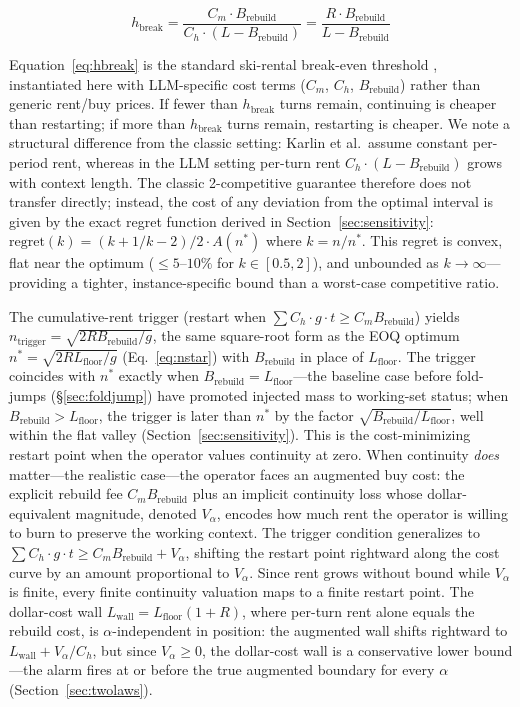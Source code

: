 \documentclass[11pt]{article}
\theoremstyle{definition}
\theoremstyle{remark}
\begin{document}
\begin{equation}
h_{\text{break}} = \frac{C_m \cdot B_{\text{rebuild}}}{C_h \cdot (L - B_{\text{rebuild}})} = \frac{R \cdot B_{\text{rebuild}}}{L - B_{\text{rebuild}}}
\label{eq:hbreak}
\end{equation}

Equation~\ref{eq:hbreak} is the standard ski-rental break-even threshold \citep{karlin1994}, instantiated here with LLM-specific cost terms ($C_m$, $C_h$, $B_{\text{rebuild}}$) rather than generic rent/buy prices. If fewer than $h_{\text{break}}$ turns remain, continuing is cheaper than restarting; if more than $h_{\text{break}}$ turns remain, restarting is cheaper. We note a structural difference from the classic setting: Karlin et al.\ assume constant per-period rent, whereas in the LLM setting per-turn rent $C_h \cdot (L - B_{\text{rebuild}})$ grows with context length. The classic 2-competitive guarantee \citep{karlin1994} therefore does not transfer directly; instead, the cost of any deviation from the optimal interval is given by the exact regret function derived in Section~\ref{sec:sensitivity}: $\text{regret}(k) = (k + 1/k - 2)/2 \cdot A(n^*)$ where $k = n/n^*$. This regret is convex, flat near the optimum ($\le 5$--$10\%$ for $k \in [0.5, 2]$), and unbounded as $k \to \infty$---providing a tighter, instance-specific bound than a worst-case competitive ratio.

The cumulative-rent trigger (restart when $\sum C_h \cdot g \cdot t \ge C_m B_{\text{rebuild}}$) yields $n_{\text{trigger}} = \sqrt{2 R B_{\text{rebuild}} / g}$, the same square-root form as the EOQ optimum $n^* = \sqrt{2 R L_{\text{floor}} / g}$ (Eq.~\ref{eq:nstar}) with $B_{\text{rebuild}}$ in place of $L_{\text{floor}}$. The trigger coincides with $n^*$ exactly when $B_{\text{rebuild}} = L_{\text{floor}}$---the baseline case before fold-jumps (\S\ref{sec:foldjump}) have promoted injected mass to working-set status; when $B_{\text{rebuild}} > L_{\text{floor}}$, the trigger is later than $n^*$ by the factor $\sqrt{B_{\text{rebuild}}/L_{\text{floor}}}$, well within the flat valley (Section~\ref{sec:sensitivity}). This is the cost-minimizing restart point when the operator values continuity at zero. When continuity \emph{does} matter---the realistic case---the operator faces an augmented buy cost: the explicit rebuild fee $C_m B_{\text{rebuild}}$ plus an implicit continuity loss whose dollar-equivalent magnitude, denoted $V_\alpha$, encodes how much rent the operator is willing to burn to preserve the working context. The trigger condition generalizes to $\sum C_h \cdot g \cdot t \ge C_m B_{\text{rebuild}} + V_\alpha$, shifting the restart point rightward along the cost curve by an amount proportional to $V_\alpha$. Since rent grows without bound while $V_\alpha$ is finite, every finite continuity valuation maps to a finite restart point. The dollar-cost wall $L_{\text{wall}} = L_{\text{floor}}(1+R)$, where per-turn rent alone equals the rebuild cost, is $\alpha$-independent in position: the augmented wall shifts rightward to $L_{\text{wall}} + V_\alpha/C_h$, but since $V_\alpha \ge 0$, the dollar-cost wall is a conservative lower bound---the alarm fires at or before the true augmented boundary for every $\alpha$ (Section~\ref{sec:twolaws}).
\end{document}
